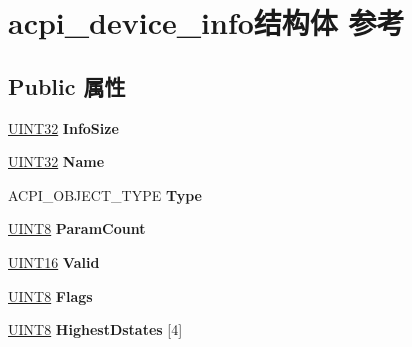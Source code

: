 \hypertarget{structacpi__device__info}{}\section{acpi\+\_\+device\+\_\+info结构体 参考}
\label{structacpi__device__info}
\subsection*{Public 属性}
\begin{DoxyCompactItemize}
\item 
\mbox{\label{structacpi__device__info_a010cc4aa51e88af548c8e138438a74b6}} 
\hyperlink{_processor_bind_8h_ae1e6edbbc26d6fbc71a90190d0266018}{U\+I\+N\+T32} {\bfseries Info\+Size}
\item 
\mbox{\label{structacpi__device__info_a25359404cb5474d29782efee109cc48e}} 
\hyperlink{_processor_bind_8h_ae1e6edbbc26d6fbc71a90190d0266018}{U\+I\+N\+T32} {\bfseries Name}
\item 
\mbox{\label{structacpi__device__info_a86ff0b21faa3f8e43a5cd842cc0bb27b}} 
A\+C\+P\+I\+\_\+\+O\+B\+J\+E\+C\+T\+\_\+\+T\+Y\+PE {\bfseries Type}
\item 
\mbox{\label{structacpi__device__info_ab16acc15f5eff02c09d524ab8957b0a7}} 
\hyperlink{_processor_bind_8h_ab27e9918b538ce9d8ca692479b375b6a}{U\+I\+N\+T8} {\bfseries Param\+Count}
\item 
\mbox{\label{structacpi__device__info_a5a13c6283d5b0dd06a9b311ee5ae679a}} 
\hyperlink{_processor_bind_8h_a09f1a1fb2293e33483cc8d44aefb1eb1}{U\+I\+N\+T16} {\bfseries Valid}
\item 
\mbox{\label{structacpi__device__info_aec9282ed34bbccc9a9d12775bd547888}} 
\hyperlink{_processor_bind_8h_ab27e9918b538ce9d8ca692479b375b6a}{U\+I\+N\+T8} {\bfseries Flags}
\item 
\mbox{\label{structacpi__device__info_abdb9c280ef0e7523fd76cbe590b7267e}} 
\hyperlink{_processor_bind_8h_ab27e9918b538ce9d8ca692479b375b6a}{U\+I\+N\+T8} {\bfseries Highest\+Dstates} \mbox{[}4\mbox{]}

\end{DoxyCompactItemize}
